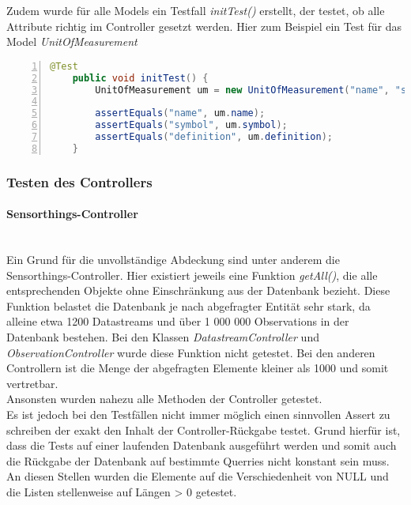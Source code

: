 Zudem wurde für alle Models ein Testfall \textit{initTest()} erstellt, der testet, ob alle Attribute richtig im Controller gesetzt werden.
Hier zum Beispiel ein Test für das Model \textit{UnitOfMeasurement}
\begin{lstlisting}[language=java,
    basicstyle=\normalfont\ttfamily,
    numbers=left,
    numberstyle=\scriptsize,
    stepnumber=1,
    numbersep=8pt,
    showstringspaces=false,
    breaklines=true,
    frame=lines,
    backgroundcolor=\color{background}]
    @Test
    public void initTest() {
        UnitOfMeasurement um = new UnitOfMeasurement("name", "symbol", "definition");

        assertEquals("name", um.name);
        assertEquals("symbol", um.symbol);
        assertEquals("definition", um.definition);
    }
\end{lstlisting}

\subsubsection{Testen des Controllers}
\paragraph{Sensorthings-Controller}\mbox{}\\
Ein Grund für die unvollständige Abdeckung sind unter anderem die Sensorthings-Controller.
Hier existiert jeweils eine Funktion \textit{getAll()}, die alle entsprechenden Objekte ohne Einschränkung aus der Datenbank bezieht.
Diese Funktion belastet die Datenbank je nach abgefragter Entität sehr stark, da alleine etwa 1200 Datastreams und über 1 000 000 Observations in der Datenbank bestehen.
Bei den Klassen \textit{DatastreamController} und \textit{ObservationController} wurde diese Funktion nicht getestet.
Bei den anderen Controllern ist die Menge der abgefragten Elemente kleiner als 1000 und somit vertretbar.
\\
Ansonsten wurden nahezu alle Methoden der Controller getestet.
\\
Es ist jedoch bei den Testfällen nicht immer möglich einen sinnvollen Assert zu schreiben der exakt den Inhalt der Controller-Rückgabe testet.
Grund hierfür ist, dass die Tests auf einer laufenden Datenbank ausgeführt werden und somit auch die Rückgabe der Datenbank auf bestimmte Querries nicht konstant sein muss.
An diesen Stellen wurden die Elemente auf die Verschiedenheit von NULL und die Listen stellenweise auf Längen > 0 getestet.

